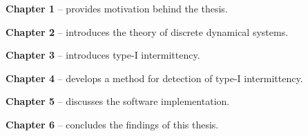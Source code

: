 \begin{description}
	\item \textbf{Chapter 1} -- provides motivation behind the thesis.
	\item \textbf{Chapter 2} -- introduces the theory of discrete dynamical systems.
	\item \textbf{Chapter 3} -- introduces type-I intermittency.
	\item \textbf{Chapter 4} -- develops a method for detection of type-I intermittency.
	\item \textbf{Chapter 5} -- discusses the software implementation.
	\item \textbf{Chapter 6} -- concludes the findings of this thesis.
\end{description}

\endinput